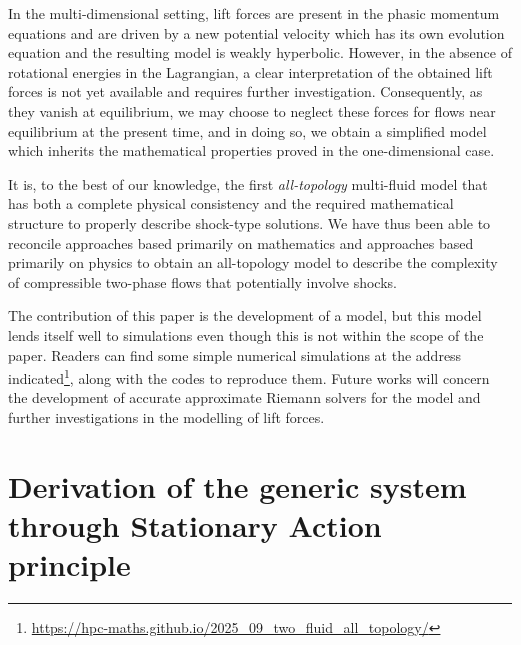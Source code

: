\documentclass{myclass}
\begin{document}
In the multi-dimensional setting, lift forces are present in the phasic momentum equations and are driven by a new potential velocity which has its own evolution equation and the resulting model is weakly hyperbolic. However, in the absence of rotational energies in the Lagrangian, a clear interpretation of the obtained lift forces is not yet available and requires further investigation. Consequently, as they vanish at equilibrium, we may choose to neglect these forces for flows near equilibrium at the present time, and in doing so, we obtain a simplified model which inherits the mathematical properties proved in the one-dimensional case.

It is, to the best of our knowledge, the first \textit{all-topology} multi-fluid model that has both a complete physical consistency and the required mathematical structure to properly describe shock-type solutions. We have thus been able to reconcile approaches based primarily on mathematics and approaches based primarily on physics to obtain an all-topology model to describe the complexity of compressible two-phase flows that potentially involve shocks.

 The contribution of this paper is the development of a model, but this model lends itself well to simulations even though this is not within the scope of the paper. Readers can find some simple numerical simulations at the address indicated\footnote{\url{https://hpc-maths.github.io/2025_09_two_fluid_all_topology/} }, along with the codes to reproduce them. Future works will concern the development of accurate approximate Riemann solvers for the model and further investigations in the modelling of lift forces. \vskip6pt

\enlargethispage{20pt}



\appendix

\section{Derivation of the generic system through Stationary Action principle}\label{app:SAP_proof}
\end{document}
